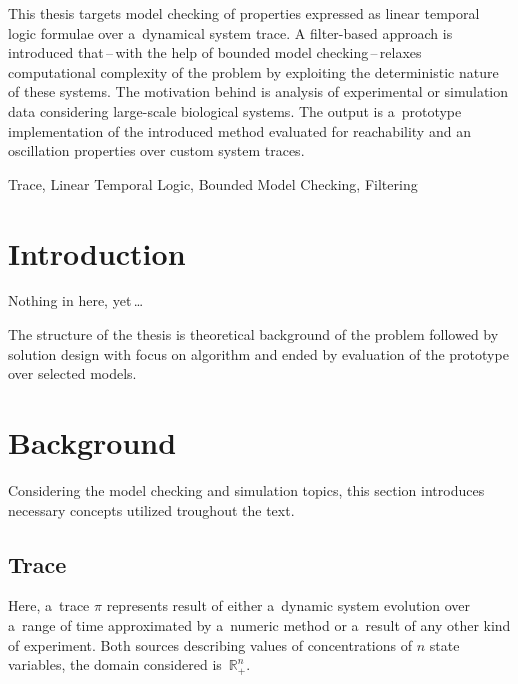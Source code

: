 \documentclass[12pt,twoside,draft]{fithesis}
\newcommand{\mReal}{\mathbb{R}}
\begin{document}
\FrontMatter
\ThesisTitlePage

\begin{ThesisDeclaration}
\DeclarationText
\AdvisorName
\end{ThesisDeclaration}


\begin{ThesisAbstract}
This thesis targets model checking of properties expressed as linear
temporal logic formulae over a~dynamical system trace. A filter-based
approach is introduced that\,--\,with the help of bounded model
checking\,--\,relaxes computational complexity of the problem by
exploiting the deterministic nature of these systems. The motivation
behind is analysis of experimental or simulation data considering
large-scale biological systems.
The output is a~prototype implementation of the introduced method
evaluated for reachability and an oscillation properties over custom
system traces. 
\end{ThesisAbstract}

\begin{ThesisKeyWords}
Trace, Linear Temporal Logic, Bounded Model Checking, Filtering
\end{ThesisKeyWords}

\MainMatter
\tableofcontents
\chapter{Introduction}
Nothing in here, yet\,\dots

The structure of the thesis is theoretical background of the problem
followed by solution design with focus on algorithm and ended by
evaluation of the prototype over selected models.

\chapter{Background}
Considering the model checking and simulation topics, this section
introduces necessary concepts utilized troughout the text.

\section{Trace}
Here, a~trace $\pi$ represents result of either a~dynamic system
evolution over a~range of time\cite{sven,pospisil} approximated by
a~numeric method or a~result of any other kind of experiment.
Both sources describing values of concentrations of $n$ state variables,
the domain considered is~$\mReal_{+}^n$.
\end{document}
